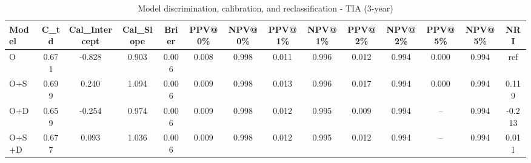 \begin{table}[htbp]
\centering
\small
\caption{Model discrimination, calibration, and reclassification - TIA (3-year)}
\label{tab:perf_tia_3y}
\begin{tabular}{lccccccccccccc}
\toprule
Model & C\_td & Cal\_Intercept & Cal\_Slope & Brier & PPV@0\% & NPV@0\% & PPV@1\% & NPV@1\% & PPV@2\% & NPV@2\% & PPV@5\% & NPV@5\% & NRI \\
\midrule
O & 0.671 & -0.828 & 0.903 & 0.006 & 0.008 & 0.998 & 0.011 & 0.996 & 0.012 & 0.994 & 0.000 & 0.994 & ref \\
O+S & 0.699 & 0.240 & 1.094 & 0.006 & 0.009 & 0.998 & 0.013 & 0.996 & 0.017 & 0.994 & 0.000 & 0.994 & 0.119 \\
O+D & 0.659 & -0.254 & 0.974 & 0.006 & 0.009 & 0.998 & 0.012 & 0.995 & 0.009 & 0.994 & -- & 0.994 & -0.213 \\
O+S+D & 0.677 & 0.093 & 1.036 & 0.006 & 0.009 & 0.998 & 0.012 & 0.995 & 0.012 & 0.994 & -- & 0.994 & 0.011 \\
\bottomrule
\end{tabular}
\end{table}